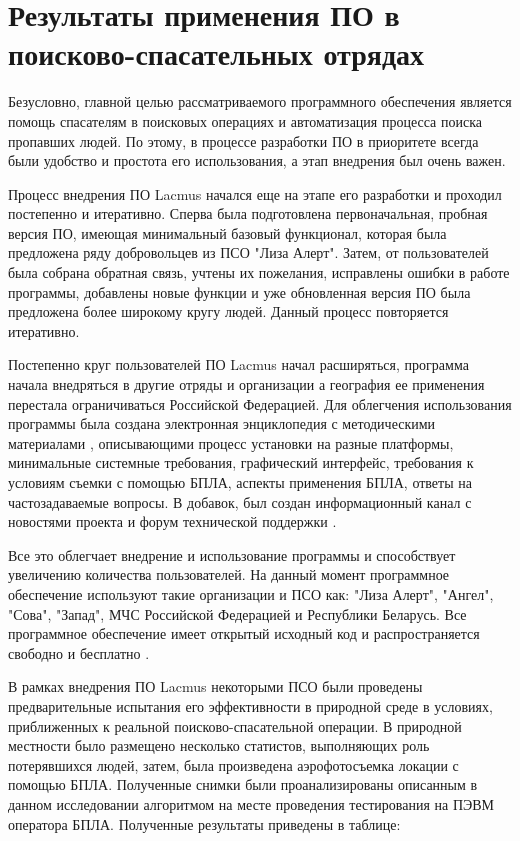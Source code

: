 \section{Результаты применения ПО в поисково-спасательных отрядах}

Безусловно, главной целью рассматриваемого программного обеспечения является помощь спасателям в поисковых операциях и автоматизация процесса поиска пропавших людей. По этому, в процессе разработки ПО в приоритете всегда были удобство и простота его использования, а этап внедрения был очень важен.

Процесс внедрения ПО Lacmus начался еще на этапе его разработки и проходил постепенно и итеративно. Сперва была подготовлена первоначальная, пробная версия ПО, имеющая минимальный базовый функционал, которая была предложена ряду добровольцев из ПСО "Лиза Алерт". Затем, от пользователей была собрана обратная связь, учтены их пожелания, исправлены ошибки в работе программы, добавлены новые функции и уже обновленная версия ПО была предложена более широкому кругу людей. Данный процесс повторяется итеративно. 

Постепенно круг пользователей ПО Lacmus начал расширяться, программа начала внедряться в другие отряды и организации а география ее применения перестала ограничиваться Российской Федерацией. Для облегчения использования программы была создана электронная энциклопедия с методическими материалами \cite{lib-lacmus-wiki}, описывающими процесс установки на разные платформы, минимальные системные требования, графический интерфейс, требования к условиям съемки с помощью БПЛА, аспекты применения БПЛА, ответы на частозадаваемые вопросы. В добавок, был создан информационный канал с новостями проекта \cite{lib-lacmus-news} и форум технической поддержки \cite{lib-lacmus-chat}.

Все это облегчает внедрение и использование программы и способствует увеличению количества пользователей. На данный момент программное обеспечение используют такие организации и ПСО как: "Лиза Алерт", "Ангел", "Сова", "Запад", МЧС Российской Федерацией и Республики Беларусь. Все программное обеспечение имеет открытый исходный код и распространяется свободно и бесплатно \cite{lib-lacmus} \cite{lib-lacmus-app}.

В рамках внедрения ПО Lacmus некоторыми ПСО были проведены предварительные испытания его эффективности в природной среде в условиях, приближенных к реальной поисково-спасательной операции. В природной местности было размещено несколько статистов, выполняющих роль потерявшихся людей, затем, была произведена аэрофотосъемка локации с помощью БПЛА. Полученные снимки были проанализированы описанным в данном исследовании алгоритмом на месте проведения тестирования на ПЭВМ оператора БПЛА. Полученные результаты приведены в таблице:

